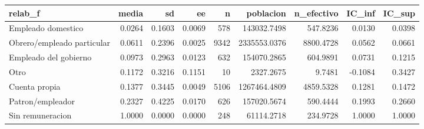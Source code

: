 \begin{tabular}{lrrrrrrrr}
\toprule
relab\_f & media & sd & ee & n & poblacion & n\_efectivo & IC\_inf & IC\_sup \\
\midrule
Empleado domestico & 0.0264 & 0.1603 & 0.0069 & 578 & 143032.7498 & 547.8236 & 0.0130 & 0.0398 \\
Obrero/empleado particular & 0.0611 & 0.2396 & 0.0025 & 9342 & 2335553.0376 & 8800.4728 & 0.0562 & 0.0661 \\
Empleado del gobierno & 0.0973 & 0.2963 & 0.0123 & 632 & 154070.2865 & 604.9891 & 0.0731 & 0.1215 \\
Otro & 0.1172 & 0.3216 & 0.1151 & 10 & 2327.2675 & 9.7481 & -0.1084 & 0.3427 \\
Cuenta propia & 0.1377 & 0.3445 & 0.0049 & 5106 & 1267464.4809 & 4859.5328 & 0.1281 & 0.1472 \\
Patron/empleador & 0.2327 & 0.4225 & 0.0170 & 626 & 157020.5674 & 590.4444 & 0.1993 & 0.2660 \\
Sin remuneracion & 1.0000 & 0.0000 & 0.0000 & 248 & 61114.2718 & 234.9728 & 1.0000 & 1.0000 \\
\bottomrule
\end{tabular}
